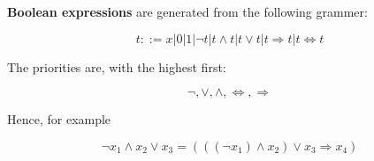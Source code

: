 \documentclass[12pt]{article}
\begin{document}
\begin{landscape}

\centerline{\textbf{Boolean expressions} are generated from the following grammer:}
$$ t ::= x | 0 | 1 | \neg t | t \wedge t | t \vee t | t \Rightarrow t | t \Leftrightarrow t $$
\centerline{The priorities are, with the highest first:}
$$\neg, \vee, \wedge, \Leftrightarrow, \Rightarrow$$
\centerline{Hence, for example}
$$\neg x_1 \wedge x_2 \vee x_3 = (((\neg x_1) \wedge x_2) \vee x_3 \Rightarrow x_4)$$

\end{landscape}
\end{document}
